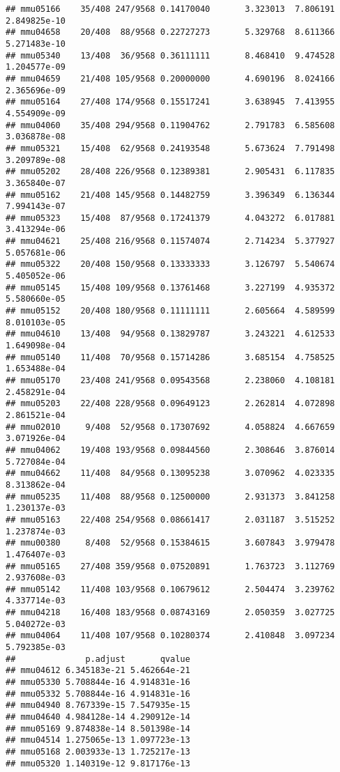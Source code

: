 \documentclass[
]{article}
\begin{document}
\begin{verbatim}
## mmu05166    35/408 247/9568 0.14170040       3.323013  7.806191 2.849825e-10
## mmu04658    20/408  88/9568 0.22727273       5.329768  8.611366 5.271483e-10
## mmu05340    13/408  36/9568 0.36111111       8.468410  9.474528 1.204577e-09
## mmu04659    21/408 105/9568 0.20000000       4.690196  8.024166 2.365696e-09
## mmu05164    27/408 174/9568 0.15517241       3.638945  7.413955 4.554909e-09
## mmu04060    35/408 294/9568 0.11904762       2.791783  6.585608 3.036878e-08
## mmu05321    15/408  62/9568 0.24193548       5.673624  7.791498 3.209789e-08
## mmu05202    28/408 226/9568 0.12389381       2.905431  6.117835 3.365840e-07
## mmu05162    21/408 145/9568 0.14482759       3.396349  6.136344 7.994143e-07
## mmu05323    15/408  87/9568 0.17241379       4.043272  6.017881 3.413294e-06
## mmu04621    25/408 216/9568 0.11574074       2.714234  5.377927 5.057681e-06
## mmu05322    20/408 150/9568 0.13333333       3.126797  5.540674 5.405052e-06
## mmu05145    15/408 109/9568 0.13761468       3.227199  4.935372 5.580660e-05
## mmu05152    20/408 180/9568 0.11111111       2.605664  4.589599 8.010103e-05
## mmu04610    13/408  94/9568 0.13829787       3.243221  4.612533 1.649098e-04
## mmu05140    11/408  70/9568 0.15714286       3.685154  4.758525 1.653488e-04
## mmu05170    23/408 241/9568 0.09543568       2.238060  4.108181 2.458291e-04
## mmu05203    22/408 228/9568 0.09649123       2.262814  4.072898 2.861521e-04
## mmu02010     9/408  52/9568 0.17307692       4.058824  4.667659 3.071926e-04
## mmu04062    19/408 193/9568 0.09844560       2.308646  3.876014 5.727084e-04
## mmu04662    11/408  84/9568 0.13095238       3.070962  4.023335 8.313862e-04
## mmu05235    11/408  88/9568 0.12500000       2.931373  3.841258 1.230137e-03
## mmu05163    22/408 254/9568 0.08661417       2.031187  3.515252 1.237874e-03
## mmu00380     8/408  52/9568 0.15384615       3.607843  3.979478 1.476407e-03
## mmu05165    27/408 359/9568 0.07520891       1.763723  3.112769 2.937608e-03
## mmu05142    11/408 103/9568 0.10679612       2.504474  3.239762 4.337714e-03
## mmu04218    16/408 183/9568 0.08743169       2.050359  3.027725 5.040272e-03
## mmu04064    11/408 107/9568 0.10280374       2.410848  3.097234 5.792385e-03
##              p.adjust       qvalue
## mmu04612 6.345183e-21 5.462664e-21
## mmu05330 5.708844e-16 4.914831e-16
## mmu05332 5.708844e-16 4.914831e-16
## mmu04940 8.767339e-15 7.547935e-15
## mmu04640 4.984128e-14 4.290912e-14
## mmu05169 9.874838e-14 8.501398e-14
## mmu04514 1.275065e-13 1.097723e-13
## mmu05168 2.003933e-13 1.725217e-13
## mmu05320 1.140319e-12 9.817176e-13

\end{verbatim}
\end{document}
